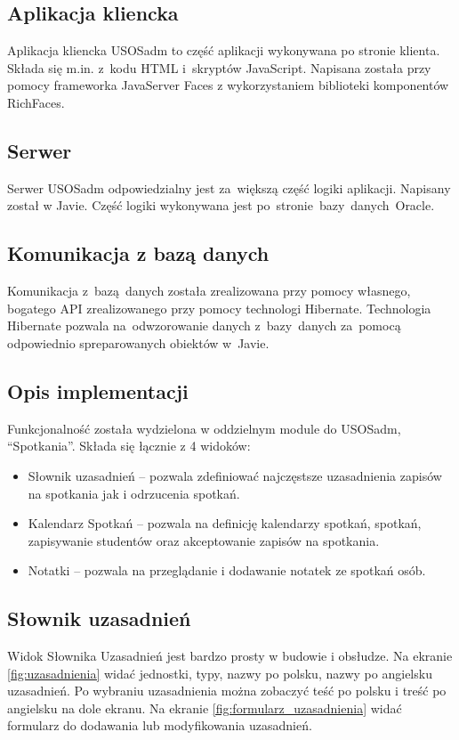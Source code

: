 \documentclass[licencjacka]{pracamgr}
\begin{document}
\subsection{Aplikacja kliencka}
Aplikacja kliencka USOSadm to część aplikacji wykonywana po stronie klienta. Składa się m.in. z~kodu HTML i~skryptów JavaScript. Napisana została przy pomocy frameworka JavaServer Faces z wykorzystaniem biblioteki komponentów RichFaces.

\subsection{Serwer}
Serwer USOSadm odpowiedzialny jest za~większą część logiki aplikacji. Napisany został w Javie. Część logiki wykonywana jest po~stronie~bazy~danych~Oracle.

\subsection{Komunikacja z bazą danych}
Komunikacja z~bazą~danych została zrealizowana przy pomocy własnego, bogatego API zrealizowanego przy pomocy technologi Hibernate. Technologia Hibernate pozwala na~odwzorowanie danych z~bazy~danych za~pomocą odpowiednio spreparowanych obiektów w~Javie.

\subsection{Opis implementacji}
Funkcjonalność została wydzielona w oddzielnym module do USOSadm, \enquote{Spotkania}. Składa się łącznie z 4 widoków:
\begin{itemize}
\item Słownik uzasadnień -- pozwala zdefiniować najczęstsze uzasadnienia zapisów na spotkania jak i odrzucenia spotkań.
\item Kalendarz Spotkań -- pozwala na definicję kalendarzy spotkań, spotkań, zapisywanie studentów oraz akceptowanie zapisów na spotkania.
\item Notatki -- pozwala na przeglądanie i dodawanie notatek ze spotkań osób.
\end{itemize}

\subsection{Słownik uzasadnień}
Widok Słownika Uzasadnień jest bardzo prosty w budowie i obsłudze. Na ekranie \ref{fig:uzasadnienia} widać jednostki, typy, nazwy po polsku, nazwy po angielsku uzasadnień. Po wybraniu uzasadnienia można zobaczyć teść po polsku i treść po angielsku na dole ekranu.
Na ekranie \ref{fig:formularz_uzasadnienia} widać formularz do dodawania lub modyfikowania uzasadnień.
\end{document}
